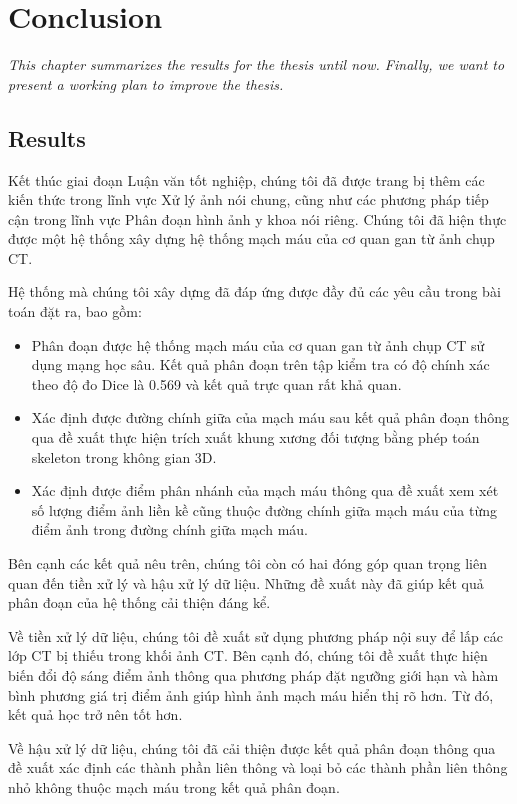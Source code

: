 \chapter{Conclusion}
\label{chap:conclusion}
	\textit{This chapter summarizes the results for the thesis until now. Finally, we want to present a working plan to improve the thesis.}
\minitoc

\section{Results}
\label{sec:results}
	Kết thúc giai đoạn Luận văn tốt nghiệp, chúng tôi đã được trang bị thêm các kiến thức trong lĩnh vực Xử lý ảnh nói chung, cũng như các phương pháp tiếp cận trong lĩnh vực Phân đoạn hình ảnh y khoa nói riêng. Chúng tôi đã hiện thực được một hệ thống xây dựng hệ thống mạch máu của cơ quan gan từ ảnh chụp CT.
	
	Hệ thống mà chúng tôi xây dựng đã đáp ứng được đầy đủ các yêu cầu trong bài toán đặt ra, bao gồm:
	\begin{itemize}
		\item Phân đoạn được hệ thống mạch máu của cơ quan gan từ ảnh chụp CT sử dụng mạng học sâu. Kết quả phân đoạn trên tập kiểm tra có độ chính xác theo độ đo Dice là 0.569 và kết quả trực quan rất khả quan.
		\item Xác định được đường chính giữa của mạch máu sau kết quả phân đoạn thông qua đề xuất thực hiện trích xuất khung xương đối tượng bằng phép toán skeleton trong không gian 3D.
		\item Xác định được điểm phân nhánh của mạch máu thông qua đề xuất xem xét số lượng điểm ảnh liền kề cũng thuộc đường chính giữa mạch máu của từng điểm ảnh trong đường chính giữa mạch máu.
	\end{itemize}
	
	 Bên cạnh các kết quả nêu trên, chúng tôi còn có hai đóng góp quan trọng liên quan đến tiền xử lý và hậu xử lý dữ liệu. Những đề xuất này đã giúp kết quả phân đoạn của hệ thống cải thiện đáng kể.
	 
	 Về tiền xử lý dữ liệu, chúng tôi đề xuất sử dụng phương pháp nội suy để lấp các lớp CT bị thiếu trong khối ảnh CT. Bên cạnh đó, chúng tôi đề xuất thực hiện biến đổi độ sáng điểm ảnh thông qua phương pháp đặt ngưỡng giới hạn và hàm bình phương giá trị điểm ảnh giúp hình ảnh mạch máu hiển thị rõ hơn. Từ đó, kết quả học trở nên tốt hơn.
	 
	 Về hậu xử lý dữ liệu, chúng tôi đã cải thiện được kết quả phân đoạn thông qua đề xuất xác định các thành phần liên thông và loại bỏ các thành phần liên thông nhỏ không thuộc mạch máu trong kết quả phân đoạn.
	 

